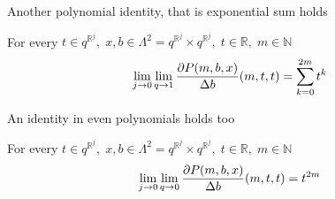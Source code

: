 Another polynomial identity, that is exponential sum holds
\begin{cor}
    \label{time_scale_pure_quantum_power_corollary_1}
    For every $t\in q^{\mathbb{R}^j}, \; x,b\in\Lambda^2 = q^{\mathbb{R}^j} \times q^{\mathbb{R}^j}, \; t\in\mathbb{R}, \; m\in\mathbb{N}$
    \begin{align*}
        \lim \limits_{j \to 0} \lim \limits_{q \to 1} \frac{\partial P ( m, b, x )}{\Delta b} (m, t, t)
        = \sum_{k=0}^{2m} t^k
    \end{align*}
\end{cor}

An identity in even polynomials holds too
\begin{cor}
    \label{time_scale_pure_quantum_power_corollary_2}
    For every $t\in q^{\mathbb{R}^j}, \; x,b\in\Lambda^2 = q^{\mathbb{R}^j} \times q^{\mathbb{R}^j}, \; t\in\mathbb{R}, \; m\in\mathbb{N}$
    \begin{align*}
        \lim \limits_{j \to 0} \lim \limits_{q \to 0} \frac{\partial P ( m, b, x )}{\Delta b} (m, t, t)
        = t^{2m}
    \end{align*}
\end{cor}

